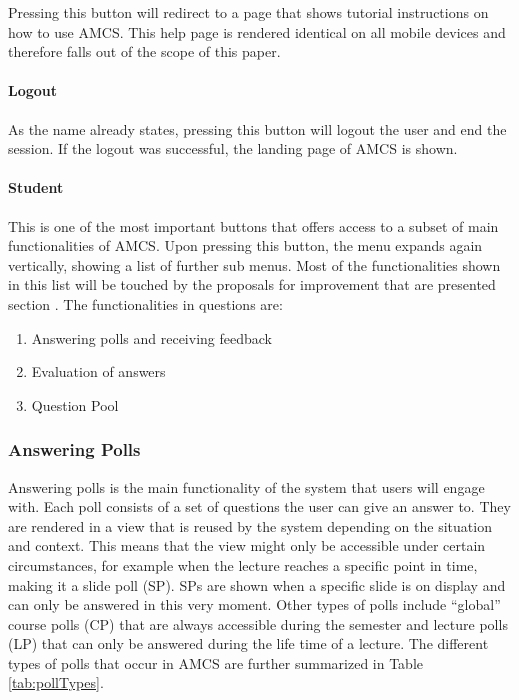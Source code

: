 Pressing this button will redirect to a page that shows tutorial instructions on how to use AMCS.
This help page is rendered identical on all mobile devices and therefore falls out of the scope of this paper.

\paragraph{Logout}

As the name already states, pressing this button will logout the user and end the session. 
If the logout was successful, the landing page of AMCS is shown.

\paragraph{Student}

This is one of the most important buttons that offers access to a subset of main functionalities of AMCS. Upon pressing this button, the menu expands again vertically, showing a list of further sub menus. Most of the functionalities shown in this list will be touched by the proposals for improvement that are presented section \todosct. The functionalities in questions are:

\begin{enumerate}
	\item Answering polls and receiving feedback
	\item Evaluation of answers
	\item Question Pool	
\end{enumerate}



\subsubsection{Answering Polls}

Answering polls is the main functionality of the system that users will engage with. Each poll consists of a set of questions the user can give an answer to. They are rendered in a view that is reused  by the system depending on the situation and context. This means that the view might only be accessible under certain circumstances, for example when the lecture reaches a specific point in time, making it a slide poll (SP). SPs are shown when a specific slide is on display and can only be answered in this very moment. Other types of polls include “global” course polls (CP) that are always accessible during the semester and lecture polls (LP) that can only be answered during the life time of a lecture. The different types of polls that occur in AMCS are further summarized in Table \ref{tab:pollTypes}.

